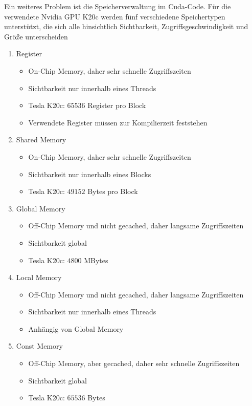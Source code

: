 {Ein weiteres Problem ist die Speicherverwaltung im Cuda-Code. Für die verwendete Nvidia GPU K20c werden fünf verschiedene Speichertypen unterstützt, die sich alle hinsichtlich Sichtbarkeit, Zugriffsgeschwindigkeit und Größe unterscheiden

\begin{enumerate}
\item Register
	\begin{itemize}
	\item On-Chip Memory, daher sehr schnelle Zugriffszeiten
	\item Sichtbarkeit nur innerhalb eines Threads
	\item Tesla K20c: $65536$ Register pro Block
	\item Verwendete Register müssen zur Kompilierzeit feststehen
	\end{itemize}
\item Shared Memory
	\begin{itemize}
	\item On-Chip Memory, daher sehr schnelle Zugriffszeiten
	\item Sichtbarkeit nur innerhalb eines Blocks
	\item Tesla K20c: $49152$ Bytes pro Block
	\end{itemize}
\item Global Memory
	\begin{itemize}
	\item Off-Chip Memory und nicht gecached, daher langsame Zugriffszeiten
	\item Sichtbarkeit global
	\item Tesla K20c: $4800$ MBytes
	\end{itemize}
\item Local Memory
	\begin{itemize}
	\item Off-Chip Memory und nicht gecached, daher langsame Zugriffszeiten
	\item Sichtbarkeit nur innerhalb eines Threads
	\item Anhängig von Global Memory
	\end{itemize}
\item Const Memory
	\begin{itemize}
	\item Off-Chip Memory, aber gecached, daher sehr schnelle Zugriffszeiten
	\item Sichtbarkeit global
	\item Tesla K20c: $65536$ Bytes
	\end{itemize}
\end{enumerate}

}
